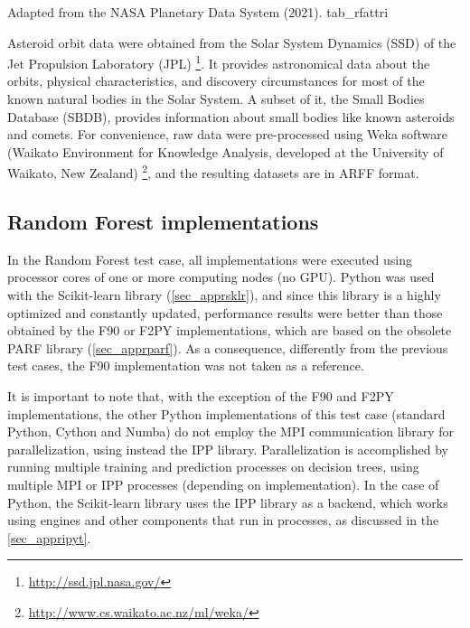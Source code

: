      {Adapted from the NASA Planetary Data System (2021).} {tab_rfattri}

Asteroid orbit data were obtained from the Solar System Dynamics (SSD) of the Jet Propulsion Laboratory (JPL) \footnote{\url{http://ssd.jpl.nasa.gov/}}. It provides astronomical data about the orbits, physical characteristics, and discovery circumstances for most of the known natural bodies in the Solar System. A subset of it, the Small Bodies Database (SBDB), provides information about small bodies like known asteroids and comets. For convenience, raw data were pre-processed using Weka software (Waikato Environment for Knowledge Analysis, developed at the University of Waikato, New Zealand) \footnote{\url{http://www.cs.waikato.ac.nz/ml/weka/}}, and the resulting datasets are in ARFF format.

%
%
%
\subsection{Random Forest implementations} %

In the Random Forest test case, all implementations were executed using processor cores of one or more computing nodes (no GPU). Python was used with the Scikit-learn library (\autoref {sec_apprsklr}), and since this library is a highly optimized and constantly updated, performance results were better than those obtained by the F90 or F2PY implementations, which are based on the obsolete PARF library (\autoref {sec_apprparf}). As a consequence, differently from the previous test cases, the F90 implementation was not taken as a reference. 

It is important to note that, with the exception of the F90 and F2PY implementations, the other Python implementations of this test case (standard Python, Cython and Numba) do not employ the MPI communication library for parallelization, using instead the IPP library. Parallelization is accomplished by running multiple training and prediction processes on decision trees, using multiple MPI or IPP processes (depending on implementation). In the case of Python, the Scikit-learn library uses the IPP library as a backend, which works using engines and other components that run in processes, as discussed in the \autoref {sec_appripyt}.

